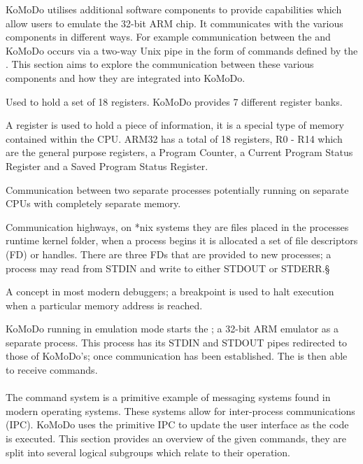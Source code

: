 KoMoDo utilises additional software components to provide capabilities which allow users to emulate the 32-bit ARM chip. It communicates with the various components in different ways. For example communication between the  and KoMoDo occurs via a two-way Unix pipe in the form of commands defined by the . This section aims to explore the communication between these various components and how they are integrated into KoMoDo.

  \begin{description}[leftmargin=!,labelwidth=\widthof{\bfseries \footnotesize inter process communication}]
    \item[\footnotesize Register bank] Used to hold a set of 18 registers. KoMoDo provides 7 different register banks.
    \item[\footnotesize Register] A register is used to hold a piece of information, it is a special type of memory contained within the CPU. ARM32 has a total of 18 registers, R0 - R14 which are the general purpose registers, a Program Counter, a Current Program Status Register and a Saved Program Status Register.
    \item[\footnotesize Inter process communication] Communication between two separate processes potentially running on separate CPUs with completely separate memory.
    \item[\footnotesize (*nix) pipes] Communication highways, on *nix systems they are files placed in the processes runtime kernel folder, when a process begins it is allocated a set of file descriptors (FD) or handles. There are three FDs that are provided to new processes; a process may read from STDIN and write to  either STDOUT or STDERR.§
    \item[\footnotesize breakpoint] A concept in most modern debuggers; a breakpoint is used to halt execution when a particular memory address is reached.
  \end{description}
%
KoMoDo running in emulation mode starts the ; a 32-bit ARM emulator as a separate process. This process has its STDIN and STDOUT pipes redirected to those of KoMoDo's; once communication has been established. The  is then able to receive commands.\\\\
%
The command system is a primitive example of messaging systems found in modern operating systems. These systems allow for inter-process communications (IPC). KoMoDo uses the primitive IPC to update the user interface as the code is executed. This section provides an overview of the given commands, they are split into several logical subgroups which relate to their operation.
